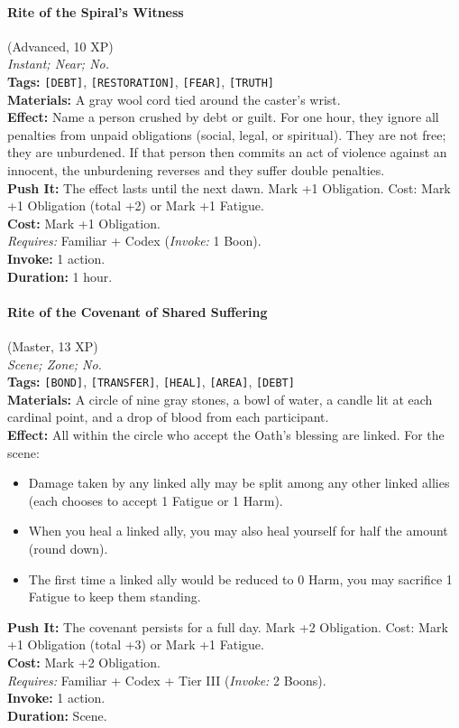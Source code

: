\paragraph{Rite of the Spiral's Witness} (Advanced, 10 XP) \hfill \\
\emph{Instant; Near; No.} \\
\textbf{Tags:} \texttt{[DEBT]}, \texttt{[RESTORATION]}, \texttt{[FEAR]}, \texttt{[TRUTH]} \\
\textbf{Materials:} A gray wool cord tied around the caster's wrist. \\
\textbf{Effect:} Name a person crushed by debt or guilt. For one hour, they ignore all penalties from unpaid obligations (social, legal, or spiritual). They are not free; they are unburdened. If that person then commits an act of violence against an innocent, the unburdening reverses and they suffer double penalties. \\
\textbf{Push It:} The effect lasts until the next dawn. Mark +1 Obligation. Cost: Mark +1 Obligation (total +2) or Mark +1 Fatigue. \\
\textbf{Cost:} Mark +1 Obligation. \\
\textit{Requires:} Familiar + Codex (\textit{Invoke:} 1 Boon). \\
\textbf{Invoke:} 1 action. \\
\textbf{Duration:} 1 hour.

\paragraph{Rite of the Covenant of Shared Suffering} (Master, 13 XP) \hfill \\
\emph{Scene; Zone; No.} \\
\textbf{Tags:} \texttt{[BOND]}, \texttt{[TRANSFER]}, \texttt{[HEAL]}, \texttt{[AREA]}, \texttt{[DEBT]} \\
\textbf{Materials:} A circle of nine gray stones, a bowl of water, a candle lit at each cardinal point, and a drop of blood from each participant. \\
\textbf{Effect:} All within the circle who accept the Oath's blessing are linked. For the scene:
\begin{itemize}
  \item Damage taken by any linked ally may be split among any other linked allies (each chooses to accept 1 Fatigue or 1 Harm).
  \item When you heal a linked ally, you may also heal yourself for half the amount (round down).
  \item The first time a linked ally would be reduced to 0 Harm, you may sacrifice 1 Fatigue to keep them standing.
\end{itemize}
\textbf{Push It:} The covenant persists for a full day. Mark +2 Obligation. Cost: Mark +1 Obligation (total +3) or Mark +1 Fatigue. \\
\textbf{Cost:} Mark +2 Obligation. \\
\textit{Requires:} Familiar + Codex + Tier III (\textit{Invoke:} 2 Boons). \\
\textbf{Invoke:} 1 action. \\
\textbf{Duration:} Scene.

